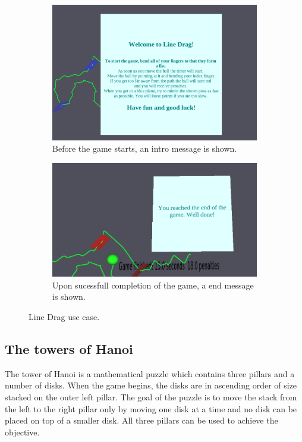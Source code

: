 \begin{figure}
\begin{subfigure}{\textwidth}
	\end{subfigure}
	\begin{subfigure}{.5\textwidth}
		\centering
		\includegraphics[width=.95\linewidth]{./images/welcome.png}
		\caption{Before the game starts, an intro message is shown.}
	\end{subfigure}%
	\begin{subfigure}{.5\textwidth}
		\centering
		\includegraphics[width=.95\linewidth]{./images/end2.png}
		\caption{Upon sucessfull completion of the game, a end message is shown.}
	\end{subfigure}
	\caption{Line Drag use case.}
	\label{fig:linedragimages}
\end{figure}

\subsection{The towers of Hanoi}
The tower of Hanoi is a mathematical puzzle which contains three pillars and a number of disks. When the game begins, the disks are in ascending order of size stacked on the outer left pillar. The goal of the puzzle is to move the stack from the left to the right pillar only by moving one disk at a time and no disk can be placed on top of a smaller disk. All three pillars can be used to achieve the objective. 

